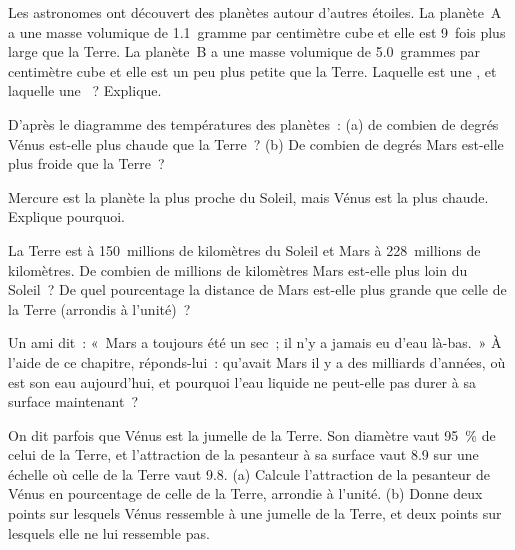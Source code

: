 \begin{exercise}[$\star\star$]\label{exo:g6:earth-a-planet:7}
Les astronomes ont découvert des planètes autour d'autres étoiles. La
planète~A a une masse volumique de 1.1~gramme par centimètre cube et elle
est 9~fois plus large que la Terre. La planète~B a une masse volumique de
5.0~grammes par centimètre cube et elle est un peu plus petite que la
Terre. Laquelle est une , et laquelle une ~? Explique.
\end{exercise}

\begin{exercise}[$\star\star$]\label{exo:g6:earth-a-planet:8}
D'après le diagramme des températures des planètes~: (a) de combien de
degrés Vénus est-elle plus chaude que la Terre~? (b) De combien de degrés
Mars est-elle plus froide que la Terre~?
\end{exercise}

\begin{exercise}[$\star\star$]\label{exo:g6:earth-a-planet:9}
Mercure est la planète la plus proche du Soleil, mais Vénus est la plus
chaude. Explique pourquoi.
\end{exercise}

\begin{exercise}[$\star\star$]\label{exo:g6:earth-a-planet:10}
La Terre est à 150~millions de kilomètres du Soleil et Mars à
228~millions de kilomètres. De combien de millions de kilomètres Mars
est-elle plus loin du Soleil~? De quel pourcentage la distance de Mars
est-elle plus grande que celle de la Terre (arrondis à l'unité)~?
\end{exercise}

\begin{exercise}[$\star\star\star$]\label{exo:g6:earth-a-planet:11}
Un ami dit~: «~Mars a toujours été un  sec~; il n'y a jamais eu d'eau
là-bas.~» À l'aide de ce chapitre, réponds-lui~: qu'avait Mars il y a des
milliards d'années, où est son eau aujourd'hui, et pourquoi l'eau liquide
ne peut-elle pas durer à sa surface maintenant~?
\end{exercise}

\begin{exercise}[$\star\star\star$]\label{exo:g6:earth-a-planet:12}
On dit parfois que Vénus est la jumelle de la Terre. Son diamètre vaut
95~\% de celui de la Terre, et l'attraction de la pesanteur à sa surface
vaut 8.9 sur une échelle où celle de la Terre vaut 9.8. (a) Calcule
l'attraction de la pesanteur de Vénus en pourcentage de celle de la Terre,
arrondie à l'unité. (b) Donne deux points sur lesquels Vénus ressemble à
une jumelle de la Terre, et deux points sur lesquels elle ne lui ressemble
pas.
\end{exercise}

